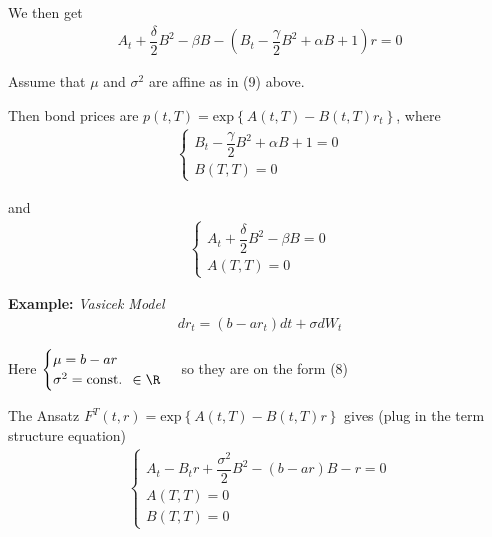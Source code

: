 \noindent We then get
\begin{equation*}
  \begin{gathered}
    A_t+\dfrac{\delta}{2}B^2-\beta B-\left(B_t-\dfrac{\gamma}{2}B^2+\alpha B+1\right)r=0
  \end{gathered}
\end{equation*}
\par\bigskip
\begin{lem}{}
  Assume that $\mu$ and $\sigma^2$ are affine as in (9) above.\par
  \noindent Then bond prices are $p(t,T) = \text{exp}\left\{A(t,T)-B(t,T)r_t\right\}$, where
  \begin{equation*}
    \begin{gathered}
      \begin{cases}
        B_t-\dfrac{\gamma}{2}B^2+\alpha B+1 = 0\\
        B(T,T) =0
      \end{cases}
    \end{gathered}
  \end{equation*}\par
  \noindent and 
  \begin{equation*}
    \begin{gathered}
      \begin{cases}
        A_t+\dfrac{\delta}{2}B^2-\beta B=0\\
        A(T,T) = 0
      \end{cases}
    \end{gathered}
  \end{equation*}
\end{lem}
\par\bigskip
\noindent\textbf{Example:} \textit{Vasicek Model}
\begin{equation*}
  \begin{gathered}
    dr_t = (b-ar_t)dt+\sigma dW_t
  \end{gathered}
\end{equation*}\par
\noindent Here $\begin{cases}
  \mu = b-ar\\\sigma^2 = \text{const. }\in\R
\end{cases}$ so they are on the form (8)
\par\bigskip
\noindent The Ansatz $F^T(t,r) = \text{exp}\left\{A(t,T)-B(t,T)r\right\}$ gives (plug in the term structure equation)
\begin{equation*}
  \begin{gathered}
    \begin{cases}
      A_t-B_tr+\dfrac{\sigma^2}{2}B^2-(b-ar)B-r=0\\
      A(T,T) = 0\\
      B(T,T) = 0
    \end{cases}
  \end{gathered}
\end{equation*}\par
